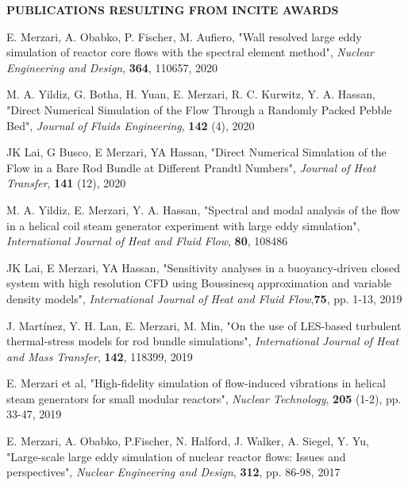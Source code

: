 \documentclass[11pt,letterpaper,english]{article}
\begin{document}
\setlength{\parindent}{0in} %


\pagestyle{fancy}   \renewcommand{%
\headrulewidth}{0.0pt}

\begin{center}
\bf {PUBLICATIONS RESULTING FROM INCITE AWARDS} \\
\end{center}
\vspace{-.25in}

E. Merzari, A. Obabko, P. Fischer, M. Aufiero, "Wall resolved large eddy simulation of reactor core flows with the spectral element method", \textit{Nuclear Engineering and Design}, \textbf{364}, 110657, 2020

M. A. Yildiz, G. Botha, H. Yuan, E. Merzari, R. C. Kurwitz, Y. A. Hassan, "Direct Numerical Simulation of the Flow Through a Randomly Packed Pebble Bed", \textit{Journal of Fluids Engineering}, \textbf{142} (4), 2020

JK Lai, G Busco, E Merzari, YA Hassan, "Direct Numerical Simulation of the Flow in a Bare Rod Bundle at Different Prandtl Numbers", \textit{Journal of Heat Transfer},  \textbf{141} (12), 2020

M. A. Yildiz, E. Merzari, Y. A. Hassan, "Spectral and modal analysis of the flow in a helical coil steam generator experiment with large eddy simulation", \textit{International Journal of Heat and Fluid Flow},  \textbf{80}, 108486

JK Lai, E Merzari, YA Hassan, "Sensitivity analyses in a buoyancy-driven closed system with high resolution CFD using Boussinesq approximation and variable density models", \textit{International Journal of Heat and Fluid Flow},\textbf{75}, pp. 1-13, 2019

J. Martínez, Y. H. Lan, E. Merzari, M. Min, "On the use of LES-based turbulent thermal-stress models for rod bundle simulations", \textit{International Journal of Heat and Mass Transfer}, \textbf{142}, 118399, 2019

E. Merzari et al, "High-fidelity simulation of flow-induced vibrations in helical steam generators for small modular reactors", \textit{Nuclear Technology}, \textbf{205} (1-2), pp. 33-47, 2019

E. Merzari, A. Obabko, P.Fischer, N. Halford, J. Walker, A. Siegel, Y. Yu, "Large-scale large eddy simulation of nuclear reactor flows: Issues and perspectives", \textit{Nuclear Engineering and Design}, \textbf{312}, pp. 86-98, 2017
\end{document}
